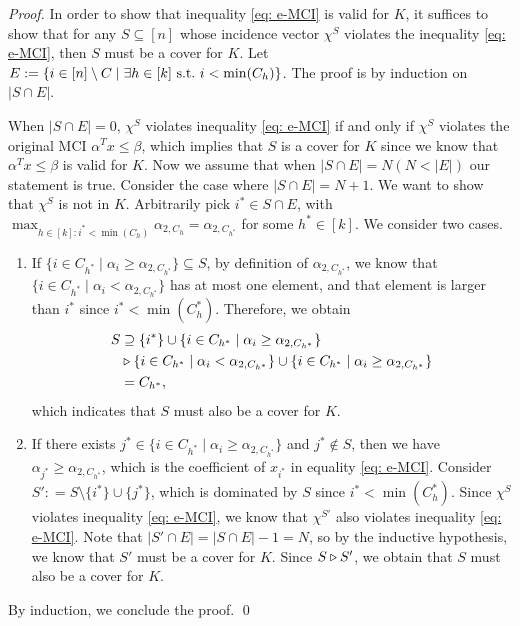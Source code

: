\begin{proof}
In order to show that inequality \eqref{eq: e-MCI} is valid for $K$, it suffices to show that for any $S \subseteq [n]$ whose incidence vector $\chi^S$ violates the inequality \eqref{eq: e-MCI}, then $S$ must be a cover for $K$. 
Let $E: = \{i \in [n] \setminus C \mid \exists h \in [k] \ \text{s.t.} \ i < \min(C_h)\}$.
The proof is by induction on $|S \cap E|$. 

When $|S \cap E| = 0$, $\chi^S$ violates inequality \eqref{eq: e-MCI} if and only if $\chi^S$ violates the original MCI $\alpha^T x \leq \beta$, which implies that $S$ is a cover for $K$ since we know that $\alpha^T x \leq \beta$ is valid for $K$. 
Now we assume that when $|S \cap E| = N (N<|E|)$ our statement is true. 
Consider the case where $|S \cap E| = N+1$.
We want to show that $\chi^S$ is not in $K$. 
Arbitrarily pick $i^* \in S \cap E$, with $\max_{h \in [k]: i^* < \min(C_h)} \alpha_{2, C_h} = \alpha_{2, C_{h^*}}$ for some $h^* \in [k]$.
We consider two cases.
\begin{enumerate}
\item If $\{i \in C_{h^*} \mid \alpha_i \geq \alpha_{2, C_{h^*}}\} \subseteq S$, by definition of $\alpha_{2, C_{h^*}}$, we know that $\{i \in C_{h^*} \mid \alpha_i < \alpha_{2, C_{h^*}}\}$ has at most one element, and that element is larger than $i^*$ since $i^* < \min(C_h^*)$. Therefore, we obtain 
\begin{align*}
S & \supseteq \{i^*\} \cup \{i \in C_{h^*} \mid \alpha_i \geq \alpha_{2, C_{h^*}}\} \\
&  \triangleright \{i \in C_{h^*} \mid \alpha_i < \alpha_{2, C_{h^*}}\} \cup \{i \in C_{h^*} \mid \alpha_i \geq\alpha_{2, C_{h^*}}\} \\
&= C_{h^*},
\end{align*}
which indicates that $S$ must also be a cover for $K$. 
\item 
If there exists $j^* \in \{i \in C_{h^*} \mid \alpha_i \geq \alpha_{2, C_{h^*}}\}$ and $j^* \notin S$, then we have $\alpha_{j^*} \geq \alpha_{2, C_{h^*}}$, which is the coefficient of $x_{i^*}$ in equality \eqref{eq: e-MCI}.
Consider $S': = S \setminus \{i^*\} \cup \{j^*\}$, which is dominated by $S$ since $i^* < \min(C_h^*)$. 
Since $\chi^S$ violates inequality \eqref{eq: e-MCI}, we know that $\chi^{S'}$ also violates inequality \eqref{eq: e-MCI}. 
Note that $|S' \cap E| = |S \cap E| - 1 = N$, so by the inductive hypothesis, we know that $S'$ must be a cover for $K$. 
Since $S \triangleright S'$, we obtain that $S$ must also be a cover for $K$.
\end{enumerate}
By induction, we conclude the proof.
\qed \end{proof}

